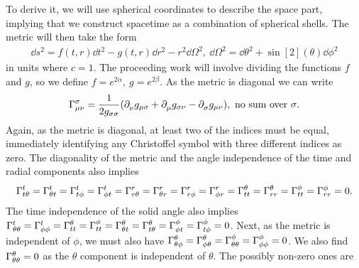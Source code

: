 To derive it, we will use spherical coordinates to describe the space part, implying that we construct spacetime as a combination of spherical shells. The metric will then take the form
\begin{align*}
	\dd{s}^{2} = f(t, r)\dd{t}^{2} - g(t, r)\dd{r}^{2} - r^{2}\dd{\Omega}^{2},\ \dd{\Omega}^{2} = \dd{\theta}^{2} + \sin[2](\theta)\dd{\phi}^{2}
\end{align*}
in units where $c = 1$. The proceeding work will involve dividing the functions $f$ and $g$, so we define $f = e^{2\alpha},\ g = e^{2\beta}$. As the metric is diagonal we can write
\begin{align*}
	\chris{\sigma}{\mu}{\nu} = \frac{1}{2g_{\sigma\sigma}}(\del{\nu}{g_{\mu\sigma}} + \del{\mu}{g_{\sigma\nu}} - \del{\sigma}{g_{\mu\nu}}),\ \text{no sum over $\sigma$.}
\end{align*}
Again, as the metric is diagonal, at least two of the indices must be equal, immediately identifying any Christoffel symbol with three different indices as zero. The diagonality of the metric and the angle independence of the time and radial components also implies
\begin{align*}
	\chris{t}{t}{\theta} = \chris{t}{\theta}{t} = \chris{t}{t}{\phi} = \chris{t}{\phi}{t} = \chris{r}{r}{\theta} = \chris{r}{\theta}{r} = \chris{r}{r}{\phi} = \chris{r}{\phi}{r} = \chris{\theta}{t}{t} = \chris{\theta}{r}{r} = \chris{\phi}{t}{t} = \chris{\phi}{r}{r} = 0.
\end{align*}
The time independence of the solid angle also implies $\chris{t}{\theta}{\theta} = \chris{t}{\phi}{\phi} = \chris{\theta}{t}{t} = \chris{\phi}{t}{t} = \chris{\theta}{\theta}{t} = \chris{\theta}{t}{\theta} = \chris{\phi}{\phi}{t} = \chris{\phi}{t}{\phi} = 0$. Next, as the metric is independent of $\phi$, we must also have $\chris{\theta}{\theta}{\phi} =	\chris{\theta}{\phi}{\theta} = \chris{\phi}{\theta}{\theta} = \chris{\phi}{\phi}{\phi} = 0$. We also find $\chris{\theta}{\theta}{\theta} = 0$ as the $\theta$ component is independent of $\theta$. The possibly non-zero ones are
